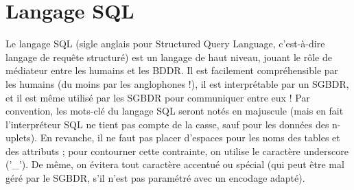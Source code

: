 \documentclass[french,11pt,twoside]{VcCours}
\begin{document}





\section{Langage SQL}

Le langage SQL (sigle anglais pour Structured Query Language, c'est-à-dire langage de requête structuré) est un langage de haut niveau, jouant le rôle de médiateur entre les humains et les BDDR. Il est facilement compréhensible par les humains (du moins par les anglophones !), il est interprétable par un SGBDR, et il est même utilisé par les SGBDR pour communiquer entre eux ! Par convention, les mots-clé du langage SQL seront notés en majuscule (mais en fait l'interpréteur SQL ne tient pas compte de la casse, sauf pour les données des n-uplets). En revanche, il ne faut pas placer d'espaces pour les noms des tables et des attributs ; pour contourner cette contrainte, on utilise le caractère underscore ('\_'). De même, on évitera tout caractère accentué ou spécial (qui peut être mal géré par le SGBDR, s'il n'est pas paramétré avec un encodage adapté).
\end{document}
